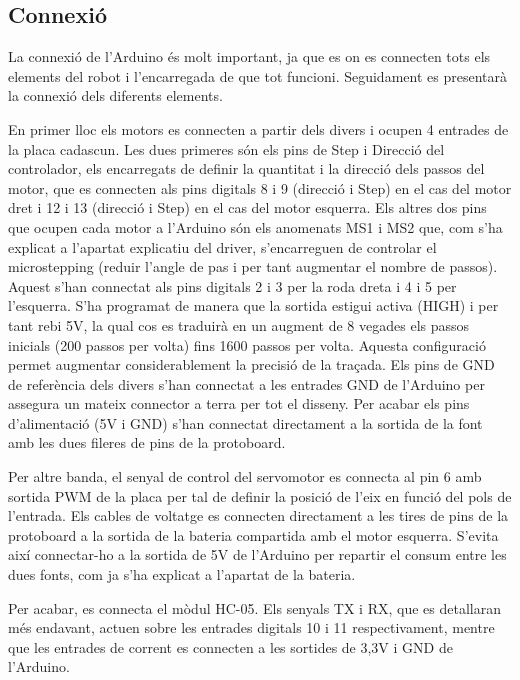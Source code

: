 \subsection{Connexió}\label{sec:connexio}

La connexió de l’Arduino és molt important, ja que es on es connecten tots els elements del robot i l’encarregada de que tot funcioni. Seguidament es presentarà la connexió dels diferents elements.

En primer lloc els motors es connecten a partir dels divers i ocupen 4 entrades de la placa cadascun. Les dues primeres són els pins de Step i Direcció del controlador, els encarregats de definir la quantitat i la direcció dels passos del motor, que es connecten als pins digitals 8 i 9 (direcció i Step) en el cas del motor dret i 12 i 13 (direcció i Step) en el cas del motor esquerra. Els altres dos pins que ocupen cada motor a l’Arduino són els anomenats MS1 i MS2 que, com s’ha explicat a l’apartat explicatiu del driver, s’encarreguen de controlar el microstepping (reduir l’angle de pas i per tant augmentar el nombre de passos). Aquest s’han connectat als pins digitals 2 i 3 per la roda dreta i 4 i 5 per l’esquerra. S’ha programat de manera que la sortida estigui activa (HIGH) i per tant rebi 5V, la qual cos es traduirà en un augment de 8 vegades els passos inicials (200 passos per volta) fins 1600 passos per volta. Aquesta configuració permet augmentar considerablement la precisió de la traçada. Els pins de GND de referència dels divers s’han connectat a les entrades GND de l’Arduino per assegura un mateix connector a terra per tot el disseny. Per acabar els pins d’alimentació (5V i GND) s’han connectat directament a la sortida de la font amb les dues fileres de pins de la protoboard. 

Per altre banda, el senyal de control del servomotor es connecta al pin 6 amb sortida PWM de la placa per tal de definir la posició de l’eix en funció del pols de l’entrada. Els cables de voltatge es connecten directament a les tires de pins de la protoboard a la sortida de la bateria compartida amb el motor esquerra.  S’evita així connectar-ho a la sortida de 5V de l’Arduino per repartir el consum entre les dues fonts, com ja s’ha explicat a l’apartat de la bateria. 

Per acabar, es connecta el mòdul HC-05. Els senyals TX i RX, que es detallaran més endavant, actuen sobre les entrades digitals 10 i 11 respectivament, mentre que les entrades de corrent es connecten a les sortides de 3,3V i GND de l’Arduino. 

